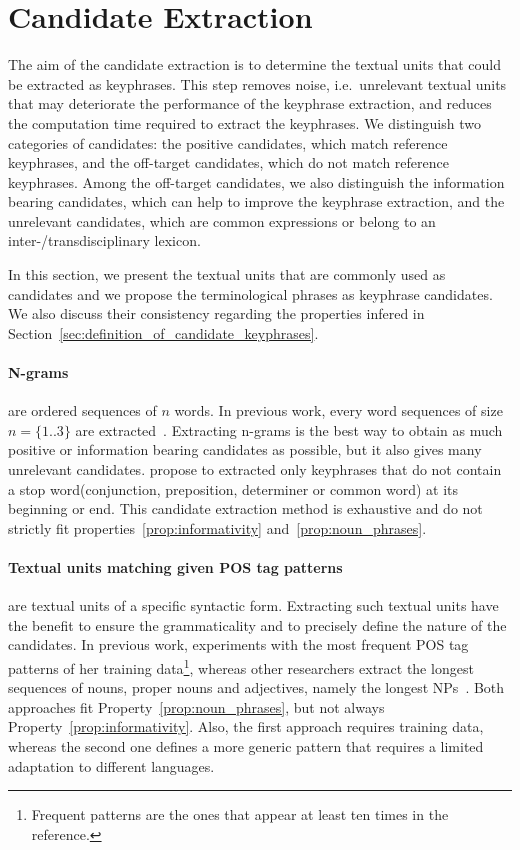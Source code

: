 \section{Candidate Extraction}
\label{sec:candidate_extraction}
  The aim of the candidate extraction is to determine the textual units that
  could be extracted as keyphrases. This step removes noise, i.e.~unrelevant
  textual units that may deteriorate the performance of the keyphrase
  extraction, and reduces the computation time required to extract the
  keyphrases. We distinguish two categories of candidates: the positive
  candidates, which match reference keyphrases, and the off-target candidates,
  which do not match reference keyphrases. Among the off-target candidates, we
  also distinguish the information bearing candidates, which can help to improve
  the keyphrase extraction, and the unrelevant candidates, which are common
  expressions or belong to an inter-/transdisciplinary lexicon.

  In this section, we present the textual units that are commonly used as
  candidates and we propose the terminological phrases as keyphrase candidates.
  We also discuss their consistency regarding the properties infered in
  Section~\ref{sec:definition_of_candidate_keyphrases}.

  \paragraph{N-grams} are ordered sequences of $n$ words. In previous work,
  every word sequences of size $n = \{1..3\}$ are
  extracted~\cite{witten1999kea,turney1999learningalgorithms,hulth2003keywordextraction}.
  Extracting n-grams is the best way to obtain as much positive or information
  bearing candidates as possible, but it also gives many unrelevant candidates.
   propose to extracted only keyphrases that do not
  contain a stop word(conjunction, preposition, determiner or common word) at
  its beginning or end. This candidate extraction method is exhaustive and do
  not strictly fit properties~\ref{prop:informativity}
  and~\ref{prop:noun_phrases}.

  \paragraph{Textual units matching given POS tag patterns} are textual units of
  a specific syntactic form. Extracting such textual units have the benefit to
  ensure the grammaticality and to precisely define the nature of the
  candidates. In previous work,  experiments
  with the most frequent POS tag patterns of her training data\footnote{Frequent
  patterns are the ones that appear at least ten times in the reference.},
  whereas other researchers extract the longest sequences of nouns, proper nouns
  and adjectives, namely the longest NPs~\cite{hassan2010conundrums}. Both
  approaches fit Property~\ref{prop:noun_phrases}, but not always
  Property~\ref{prop:informativity}. Also, the first approach requires training
  data, whereas the second one defines a more generic pattern that requires a
  limited adaptation to different languages.

